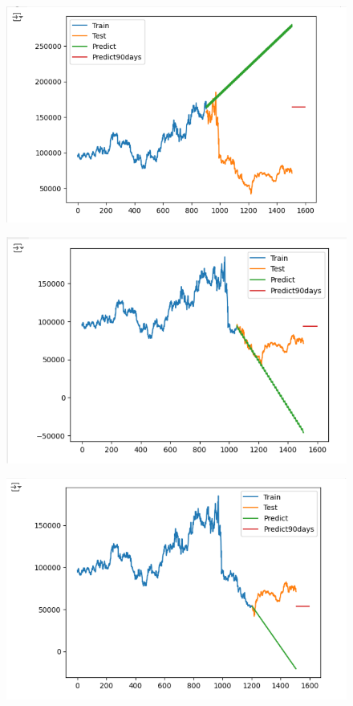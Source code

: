 \documentclass{article}
\begin{document}
\begin{multicols}{2}
\begin{figure}[H]
    \centering
    \begin{minipage}{0.15\textwidth}
    \centering
    \includegraphics[width=1\textwidth]{Image/ARIMA/90_6_4_LG_Arima.png}
   
    \label{fig:1}
    \end{minipage}%
    \begin{minipage}{0.15\textwidth}
    \centering
    \includegraphics[width=1\textwidth]{Image/ARIMA/90_7_3_LG_Arima.png}
  
    \label{fig:2}
    \end{minipage}%
    \begin{minipage}{0.15\textwidth}
    \centering
    \includegraphics[width=1\textwidth]{Image/ARIMA/90_8_2_LG_Arima.png}


\end{minipage}
\end{figure}
\end{multicols}
\end{document}
